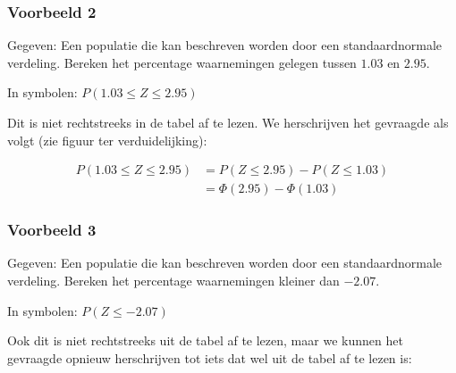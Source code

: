 \documentclass[12pt,twoside]{article}
\begin{document}
{\subsubsection*{Voorbeeld 2}

Gegeven: Een populatie die kan beschreven worden door een standaardnormale verdeling. Bereken het percentage waarnemingen gelegen tussen $1.03$ en $2.95$.

In symbolen: $P(1.03\leq Z\leq 2.95)$

Dit is niet rechtstreeks in de tabel af te lezen. We herschrijven het gevraagde als volgt (zie figuur ter verduidelijking):

\begin{align*}
  P(1.03\leq Z\leq 2.95) &= P(Z\leq 2.95) - P(Z\leq 1.03)\\
                         &= \Phi(2.95) - \Phi(1.03)
\end{align*}

\begin{center}
\end{center}

\subsubsection*{Voorbeeld 3}

Gegeven: Een populatie die kan beschreven worden door een standaardnormale verdeling. Bereken het percentage waarnemingen kleiner dan $-2.07$.

In symbolen: $P(Z\leq -2.07)$

Ook dit is niet rechtstreeks uit de tabel af te lezen, maar we kunnen het gevraagde opnieuw herschrijven tot iets dat wel uit de tabel af te lezen is:

}
\end{document}

